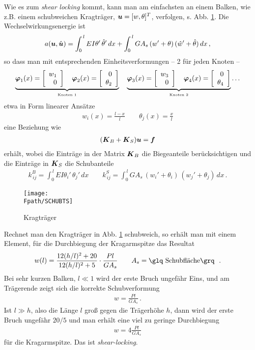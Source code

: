 {\small Wie es zum {\em shear locking\/} kommt, kann man am einfachsten an einem Balken, wie z.B. einem schubweichen Kragtr\"{a}ger, $\vek u = [w, \theta]^T$, verfolgen, s. Abb. \ref{Schubts}. Die Wechselwirkungsenergie ist
\begin{align}
a(\vek u, \hat{\vek u}) = \int_0^{\,l} EI \theta' \, \hat \theta' \, dx + \int_0^{\,l} G
A_s \,(w' + \theta)\, (\hat w' + \hat \theta) \, dx \,,
\end{align}
so dass man mit entsprechenden Einheitsverformungen -- 2 f\"{u}r jeden Knoten --
\begin{align}
\underbrace{\vek \Np_1 (x) = \left [ \barr {r } w_1 \\ 0 \earr \right ] \quad \vek \Np_2
(x)
 = \left [ \barr {r } 0 \\ \theta_2 \earr \right ]}_{\mbox{\tiny{Knoten 1}}} \quad \underbrace{\vek \Np_3 (x)
  = \left [ \barr {r } w_3 \\ 0 \earr \right ] \quad \vek \Np_4 (x)
   = \left [ \barr {r } 0 \\ \theta_4 \earr \right ]}_{\mbox{\tiny{Knoten 2}}} \ldots
\end{align}
etwa in Form linearer Ans\"{a}tze
\begin{align}
 w_i(x) = \frac{l - x}{l} \qquad \theta_j(x) =
\frac{x}{l}
\end{align}
eine Beziehung wie \begin{align} \label{KSchub} (\vek K_B + \vek K_S) \vek u = \vek f \end{align} erh\"{a}lt, wobei die Eintr\"{a}ge in der Matrix $\vek K_B$ die Biegeanteile ber\"{u}cksichtigen und die Eintr\"{a}ge in $\vek K_S$ die Schubanteile
\begin{align}
k^B_{\,ij} = \int_0^{\,l} EI \theta_i' \,\theta_j' \, dx \qquad k^S_{\,ij} =
\int_0^{\,l} GA_s\, (w_i' + \theta_i )\,(w_j' + \theta_j) \, dx \,.
\end{align}
\begin{figure}[tbp]
\centering
\if {} \sidecaption \fi
\texttt{[image: \\Fpath/SCHUBTS]}
\caption{Kragtr\"{a}ger} \label{Schubts}
\end{figure}%
Rechnet man den Kragtr\"{a}ger in Abb. \ref{Schubts} schubweich, so erh\"{a}lt man mit einem Element, f\"{u}r die Durchbiegung der Kragarmspitze das Resultat
\begin{align}
w(l) = \frac{12 (h/l)^2 +  20}{12 (h/l)^2 +  5} \cdot  \frac{P l}{GA_s}  \qquad
 A_s = \mbox{\glq Schubfl\"{a}che\grq \,}\,.
\end{align}
Bei sehr kurzen Balken, $l \ll 1$ wird der erste Bruch ungef\"{a}hr Eins, und am Tr\"{a}gerende zeigt sich die korrekte Schubverformung
\begin{align}
 w = \frac{P l}{GA_s} \,.
\end{align}
Ist $l \gg h$, also die L\"{a}nge $l$ gro{\ss} gegen die Tr\"{a}gerh\"{o}he $h$, dann wird der erste Bruch ungef\"{a}hr $20/5$ und man erh\"{a}lt eine viel zu geringe Durchbiegung
\begin{align}
 w = 4 \frac{P l}{GA_s}
\end{align}
f\"{u}r die Kragarmspitze. Das ist {\em shear-locking}.

}
